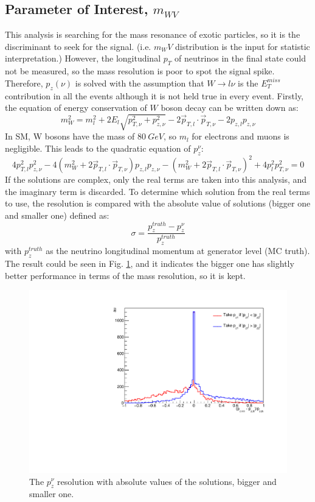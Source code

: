 \subsection{Parameter of Interest, $m_{WV}$}
This analysis is searching for the mass resonance of exotic particles, so it is the discriminant to seek for the signal. (i.e. $m_WV$ distribution is the input for statistic interpretation.) However, the longitudinal $p_{T}$ of neutrinos in the final state could not be measured, so the mass resolution is poor to spot the signal spike. Therefore, $p_{z}(\nu)$ is solved with the assumption that $W\rightarrow l\nu$ is the $E^{miss}_{T}$ contribution in all the events although it is not held true in every event. Firstly, the equation of energy conservation of $W$ boson decay can be written down as:
\begin{equation}
m^2_W = m_{l}^{2} + 2E_{l}\sqrt{ p_{T,\nu}^2 + p_{z,\nu}^{2} }  - 2 \vec{p}_{{T},l} \cdot \vec{p}_{T, \nu} - 2 p_{z, l} p_{z,\nu}
\end{equation}
\noindent
In SM, W bosons have the mass of $80~GeV$, so $m_{l}$ for electrons and muons is negligible. This leads to the quadratic equation of $p_{z}^\nu$:
\begin{equation}
4p_{{T}, l}^{2} p_{z,\nu}^{2} - 4 \left( m_{W}^{2} + 2 \vec{p}_{{T}, l} \cdot \vec{p}_{{T},\nu} \right) p_{z,l} p_{z, \nu} - \left( m_{W}^{2} + 2\vec{p}_{{T}, l} \cdot \vec{p}_{{T},\nu}  \right)^{2} +4p_l^{2} p_{{T},\nu}^{2} = 0
\end{equation}
\noindent
If the solutions are complex, only the real terms are taken into this analysis, and the imaginary term is discarded. To determine which solution from the real terms to use, the resolution is compared with the absolute value of solutions (bigger one and smaller one) defined as:
\begin{equation}
\sigma = \frac{p_z^{truth}-p_z^{\nu}}{p_z^{truth}}
\end{equation}
\noindent
with $p_z^{truth}$ as the neutrino longitudinal momentum at generator level (MC truth). The result could be seen in Fig. \ref{Fig:netrinoPz}, and it indicates the bigger one has slightly better performance in terms of the mass resolution, so it is kept.  
\begin{figure}
	\centering
    \includegraphics[width=0.5\hsize]{Chapter3/neutrinoPz}
    \caption{The $p_{z}^\nu$ resolution with absolute values of the solutions, bigger and smaller one. }
    \label{Fig:netrinoPz}
\end{figure}
